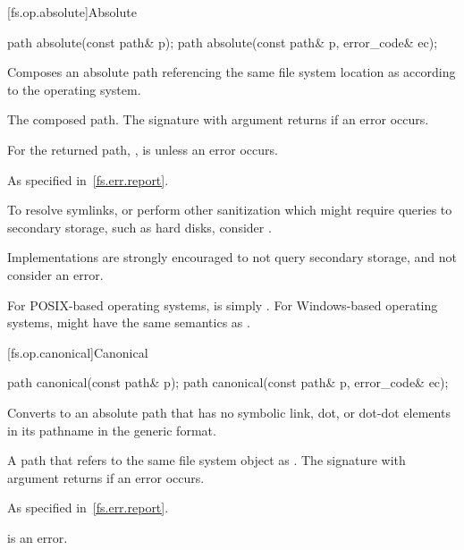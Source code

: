 [fs.op.absolute]{Absolute}

%
\begin{itemdecl}
path absolute(const path& p);
path absolute(const path& p, error_code& ec);
\end{itemdecl}

\begin{itemdescr}
\pnum
\effects
Composes an absolute path referencing the same file system location
as  according to the operating system.

\pnum
\returns
The composed path.
The signature with argument  returns  if an error occurs.

\pnum
\begin{note}
For the returned path, ,  is 
unless an error occurs.
\end{note}

\pnum
\throws
As specified in~\ref{fs.err.report}.

\pnum
\begin{note}
To resolve symlinks,
or perform other sanitization which might require queries to secondary storage,
such as hard disks, consider .
\end{note}

\pnum
\begin{note}
Implementations are strongly encouraged to not query secondary storage,
and not consider  an error.
\end{note}

\pnum
\begin{example}
For POSIX-based operating systems,
 is simply .
For Windows-based operating systems,
 might have the same semantics as .
\end{example}
\end{itemdescr}

[fs.op.canonical]{Canonical}

%
\begin{itemdecl}
path canonical(const path& p);
path canonical(const path& p, error_code& ec);
\end{itemdecl}

\begin{itemdescr}
\pnum
\effects
Converts  to an absolute
path that has no symbolic link, dot, or dot-dot elements
in its pathname in the generic format.

\pnum
\returns
A path that refers to
the same file system object as .
The signature with argument  returns  if an error occurs.

\pnum
\throws
As specified in~\ref{fs.err.report}.

\pnum
\remarks
{} is an error.
\end{itemdescr}

